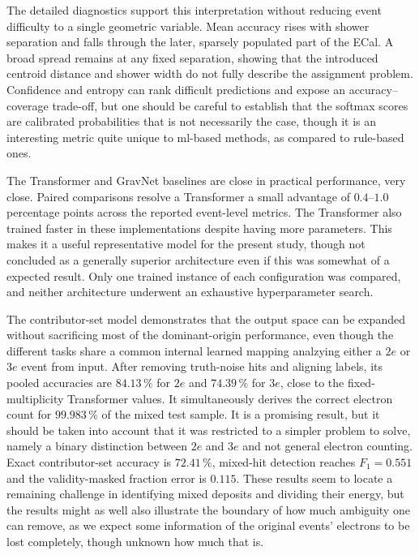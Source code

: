The detailed diagnostics support this interpretation without reducing event
difficulty to a single geometric variable. Mean accuracy rises with shower separation and falls through the later, sparsely populated part of the
ECal. A broad spread remains at any fixed separation, showing that the introduced centroid
distance and shower width do not fully describe the assignment problem.
Confidence and entropy can rank difficult predictions and expose an
accuracy--coverage trade-off, but one should be careful to establish that the softmax scores are calibrated probabilities that is not necessarily the case, though it is an interesting metric quite unique to \gls{ml}-based methods, as compared to rule-based ones. 

The Transformer and GravNet baselines are close in practical performance, very close.
Paired comparisons resolve a Transformer a small advantage of \(0.4\)--\(1.0\)
percentage points across the reported event-level metrics. The Transformer also trained faster in these implementations despite
having more parameters. This makes it a useful representative model for the
present study, though not concluded as a generally superior architecture even if this was somewhat of a expected result. Only one trained instance of each configuration was compared, and neither architecture underwent an exhaustive hyperparameter search.

The contributor-set model demonstrates that the output space can be expanded
without sacrificing most of the dominant-origin performance, even though the different tasks share a common internal learned mapping analzying either a $2e$ or $3e$ event from input. After removing truth-noise hits and aligning labels, its pooled accuracies are \(84.13\,\%\) for \(2e\) and \(74.39\,\%\) for \(3e\), close to the
fixed-multiplicity Transformer values. It simultaneously derives the correct
electron count for \(99.983\,\%\) of the mixed test sample. It is a promising result, but it should be taken into account that it was restricted to a simpler problem to solve, namely a binary distinction between \(2e\) and \(3e\) and not general electron counting. Exact contributor-set accuracy is \(72.41\,\%\), mixed-hit detection reaches \(F_1=0.551\) and the validity-masked fraction error is \(0.115\). These results seem to locate a remaining challenge in identifying mixed deposits and dividing their energy, but the results might as well also illustrate the boundary of how much ambiguity one can remove, as we expect some information of the original events' electrons to be lost completely, though unknown how much that is. 

